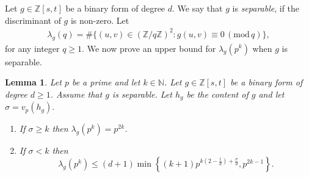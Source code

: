 \documentclass[reqno, 11pt]{amsart}
\renewcommand{\leq}{\leqslant}
\renewcommand{\geq}{\geqslant}
\newtheorem{lemma}[theorem]{Lemma}
\theoremstyle{definition}
\theoremstyle{definition}
\renewcommand{\geq}{\geqslant}
\renewcommand{\leq}{\leqslant}
\renewcommand{\mod}{\mathrm{mod}\,}
\newcommand{\ZZ}{\mathbb{Z}}
\newcommand{\NN}{\mathbb{N}}
\numberwithin{equation}{section}
\begin{document}
Let \(g\in \ZZ[s,t]\) be a binary form of degree \(d\). We say that $g$ is \emph{separable}, if the discriminant of $g$ is non-zero. Let
\begin{align}
	\lambda_g(q) = \# \{(u, v) \in (\ZZ / q\ZZ)^2: g(u, v) \equiv 0 \, (\mod q) \},
\end{align}
for any integer $q \geq 1$.
We now prove an upper bound for $\lambda_g(p^k)$ when $g$ is separable.
\begin{lemma}\label{bound-lambda}
	Let $p$ be a prime and let $k \in \NN$. Let $g \in \ZZ[s, t]$ be a binary form of degree $d \geq 1$. Assume that $g$ is separable. Let $h_g$ be the content of $g$ and let $\sigma = v_p(h_g).$
	\begin{enumerate}
		\item If $\sigma \geq k$ then $\lambda_g(p^k) = p^{2k}$.
		\item If $\sigma < k$ then
	$$\lambda_g(p^k) \leq (d+1) \min \left\{(k+1) p^{k(2 - \frac{1}{d}) + \frac{\sigma}{d}}, p^{2k-1} \right\}. $$ 
	\end{enumerate}
\end{lemma}
\end{document}
